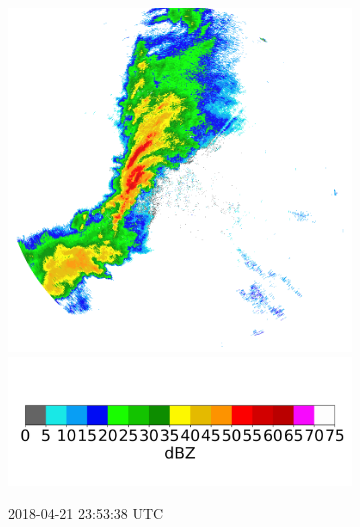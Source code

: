 \begin{figure}[h]
\begin{subfigure}[b]{0.3\textwidth}
		\includegraphics[width=\textwidth]{./thesis_code/plots/midlothian.tx-20180421-235338-ref.png}
		\includegraphics[width=\textwidth]{./thesis_code/plots/dfw_colormap.png}
		\caption{2018-04-21 23:53:38 UTC}
		\label{fig:bestmodel_translation4}
	\end{subfigure}
	\begin{subfigure}[b]{0.3\textwidth}

\end{subfigure}
\end{figure}
